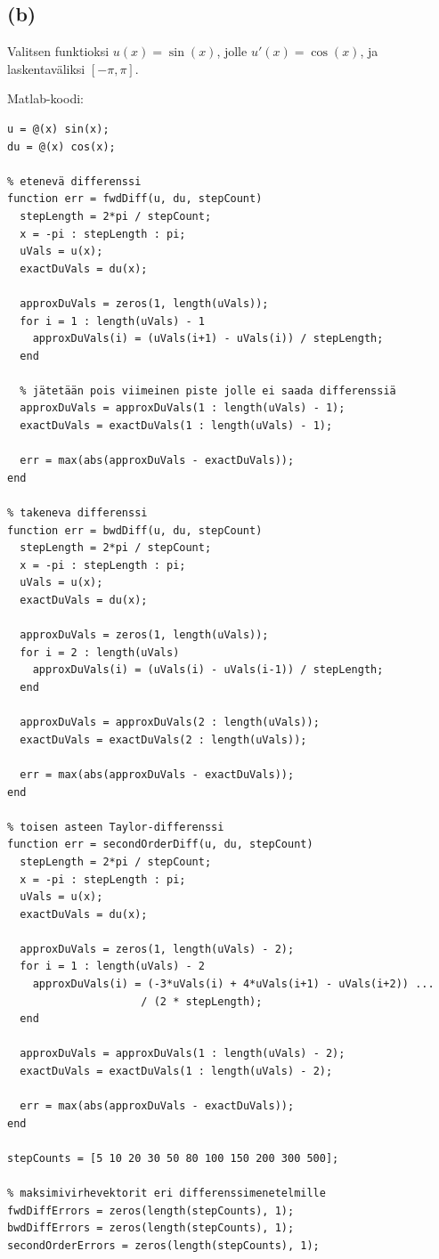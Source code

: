 \documentclass{article}
\begin{document}
\subsection*{(b)}

Valitsen funktioksi $u(x) = \sin(x)$, jolle $u'(x) = \cos(x)$, ja
laskentaväliksi $[-\pi, \pi]$.

Matlab-koodi:
\begin{verbatim}
u = @(x) sin(x);
du = @(x) cos(x);

% etenevä differenssi
function err = fwdDiff(u, du, stepCount)
  stepLength = 2*pi / stepCount;
  x = -pi : stepLength : pi;
  uVals = u(x);
  exactDuVals = du(x);

  approxDuVals = zeros(1, length(uVals));
  for i = 1 : length(uVals) - 1
    approxDuVals(i) = (uVals(i+1) - uVals(i)) / stepLength;
  end

  % jätetään pois viimeinen piste jolle ei saada differenssiä
  approxDuVals = approxDuVals(1 : length(uVals) - 1);
  exactDuVals = exactDuVals(1 : length(uVals) - 1);

  err = max(abs(approxDuVals - exactDuVals));
end

% takeneva differenssi
function err = bwdDiff(u, du, stepCount)
  stepLength = 2*pi / stepCount;
  x = -pi : stepLength : pi;
  uVals = u(x);
  exactDuVals = du(x);

  approxDuVals = zeros(1, length(uVals));
  for i = 2 : length(uVals)
    approxDuVals(i) = (uVals(i) - uVals(i-1)) / stepLength;
  end

  approxDuVals = approxDuVals(2 : length(uVals));
  exactDuVals = exactDuVals(2 : length(uVals));

  err = max(abs(approxDuVals - exactDuVals));
end

% toisen asteen Taylor-differenssi
function err = secondOrderDiff(u, du, stepCount)
  stepLength = 2*pi / stepCount;
  x = -pi : stepLength : pi;
  uVals = u(x);
  exactDuVals = du(x);

  approxDuVals = zeros(1, length(uVals) - 2);
  for i = 1 : length(uVals) - 2
    approxDuVals(i) = (-3*uVals(i) + 4*uVals(i+1) - uVals(i+2)) ...
                     / (2 * stepLength);
  end

  approxDuVals = approxDuVals(1 : length(uVals) - 2);
  exactDuVals = exactDuVals(1 : length(uVals) - 2);

  err = max(abs(approxDuVals - exactDuVals));
end

stepCounts = [5 10 20 30 50 80 100 150 200 300 500];

% maksimivirhevektorit eri differenssimenetelmille
fwdDiffErrors = zeros(length(stepCounts), 1);
bwdDiffErrors = zeros(length(stepCounts), 1);
secondOrderErrors = zeros(length(stepCounts), 1);


\end{verbatim}
\end{document}
